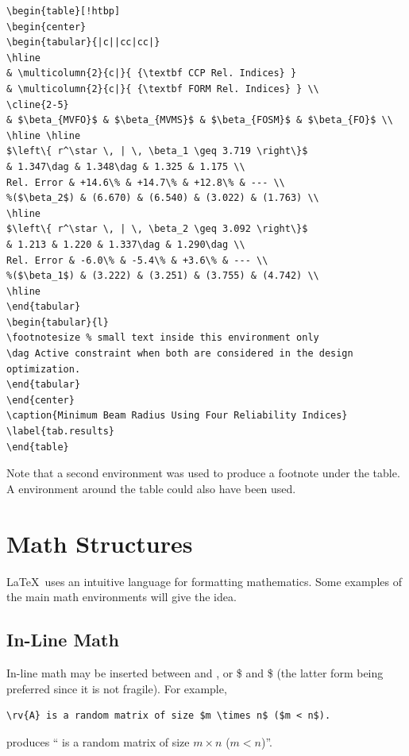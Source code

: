 \begin{verbatim}
\begin{table}[!htbp]
\begin{center}
\begin{tabular}{|c||cc|cc|}
\hline
& \multicolumn{2}{c|}{ {\textbf CCP Rel. Indices} }
& \multicolumn{2}{c|}{ {\textbf FORM Rel. Indices} } \\
\cline{2-5}
& $\beta_{MVFO}$ & $\beta_{MVMS}$ & $\beta_{FOSM}$ & $\beta_{FO}$ \\
\hline \hline
$\left\{ r^\star \, | \, \beta_1 \geq 3.719 \right\}$
& 1.347\dag & 1.348\dag & 1.325 & 1.175 \\
Rel. Error & +14.6\% & +14.7\% & +12.8\% & --- \\
%($\beta_2$) & (6.670) & (6.540) & (3.022) & (1.763) \\
\hline
$\left\{ r^\star \, | \, \beta_2 \geq 3.092 \right\}$
& 1.213 & 1.220 & 1.337\dag & 1.290\dag \\
Rel. Error & -6.0\% & -5.4\% & +3.6\% & --- \\
%($\beta_1$) & (3.222) & (3.251) & (3.755) & (4.742) \\
\hline
\end{tabular}
\begin{tabular}{l}
\footnotesize % small text inside this environment only
\dag Active constraint when both are considered in the design 
optimization.
\end{tabular}
\end{center}
\caption{Minimum Beam Radius Using Four Reliability Indices}
\label{tab.results}
\end{table}
\end{verbatim}
Note that a second  environment was used to produce a footnote under the table.
A  environment around the table could also have been used.
\section{Math Structures}
\LaTeX\ uses an intuitive language for formatting mathematics.
Some examples of the main math environments will give the idea.
\subsection{In-Line Math}
In-line math may be inserted between \cmmd{(} and \cmmd{)}, or \$ and \$ (the latter form being preferred since it is not fragile).
For example,
\begin{verbatim}
\rv{A} is a random matrix of size $m \times n$ ($m < n$).
\end{verbatim}
produces `` is a random matrix of size $m \times n$ ($m < n$)''.
